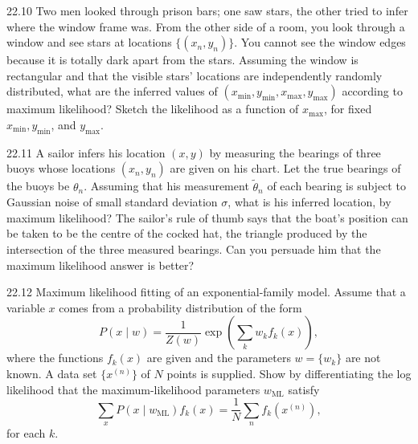 \documentclass[12pt, a4paper]{article}
\begin{document}
\begin{prob}{22.10}
Two men looked through prison bars; one saw stars, the other tried to infer where the window frame was. From the other side of a room, you look through a window and see stars at locations $\{(x_n,y_n)\}$. You cannot see the window edges because it is totally dark apart from the stars. Assuming the window is rectangular and that the visible stars’ locations are independently randomly distributed, what are the inferred values of $(x_{\min}, y_{\min}, x_{\max}, y_{\max})$ according to maximum likelihood? Sketch the likelihood as a function of $x_{\max}$, for fixed $x_{\min}, y_{\min}$, and $y_{\max}$.
\end{prob}
\begin{sol}
\end{sol}
\bigskip

\begin{prob}{22.11}
A sailor infers his location $(x,y)$ by measuring the bearings of three buoys whose locations $(x_n,y_n)$ are given on his chart. Let the true bearings of the buoys be $\theta_n$. Assuming that his measurement $\tilde{\theta}_n$ of each bearing is subject to Gaussian noise of small standard deviation $\sigma$, what is his inferred location, by maximum likelihood? The sailor’s rule of thumb says that the boat’s position can be taken to be the centre of the cocked hat, the triangle produced by the intersection of the three measured bearings. Can you persuade him that the maximum likelihood answer is better?
\end{prob}
\begin{sol}
\end{sol}
\bigskip

\begin{prob}{22.12}
Maximum likelihood fitting of an exponential-family model. Assume that a variable $x$ comes from a probability distribution of the form
\[
P(x \mid w) = \frac{1}{Z(w)}\exp\left(\sum_k w_k f_k(x)\right),
\]
where the functions $f_k(x)$ are given and the parameters $w = \{w_k\}$ are not known. A data set $\{x^{(n)}\}$ of $N$ points is supplied. Show by differentiating the log likelihood that the maximum-likelihood parameters $w_{\mathrm{ML}}$ satisfy
\[
\sum_x P(x\mid w_{\mathrm{ML}})f_k(x) = \frac{1}{N}\sum_n f_k(x^{(n)}),
\]
for each $k$.
\end{prob}
\begin{sol}
\end{sol}
\bigskip
\end{document}
